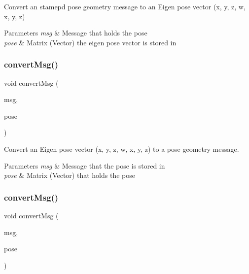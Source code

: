 Convert an stamepd pose geometry message to an Eigen pose vector (x, y, z, w, x, y, z) 


\begin{DoxyParams}{Parameters}
{\em msg} & Message that holds the pose \\
\hline
{\em pose} & Matrix (Vector) the eigen pose vector is stored in \\
\hline
\end{DoxyParams}
\mbox{\label{group__transport__controller_ga7beb50c98e49263d05b3b819be58d76c}} 
\subsubsection{\texorpdfstring{convert\+Msg()}{convertMsg()}\hspace{0.1cm}{\footnotesize\ttfamily [8/13]}}
{\footnotesize\ttfamily void convert\+Msg (\begin{DoxyParamCaption}\item[{geometry\+\_\+msgs\+::\+Pose \&}]{msg,  }\item[{Eigen\+::\+Matrix$<$ double, 7, 1 $>$ \&}]{pose }\end{DoxyParamCaption})}



Convert an Eigen pose vector (x, y, z, w, x, y, z) to a pose geometry message. 


\begin{DoxyParams}{Parameters}
{\em msg} & Message that the pose is stored in \\
\hline
{\em pose} & Matrix (Vector) that holds the pose \\
\hline
\end{DoxyParams}
\mbox{\label{group__transport__controller_gaf1628de186f2d90b064f8c8b36beef53}} 
\subsubsection{\texorpdfstring{convert\+Msg()}{convertMsg()}\hspace{0.1cm}{\footnotesize\ttfamily [9/13]}}
{\footnotesize\ttfamily void convert\+Msg (\begin{DoxyParamCaption}\item[{geometry\+\_\+msgs\+::\+Pose\+Stamped \&}]{msg,  }\item[{Eigen\+::\+Matrix$<$ double, 7, 1 $>$ \&}]{pose }\end{DoxyParamCaption})}



